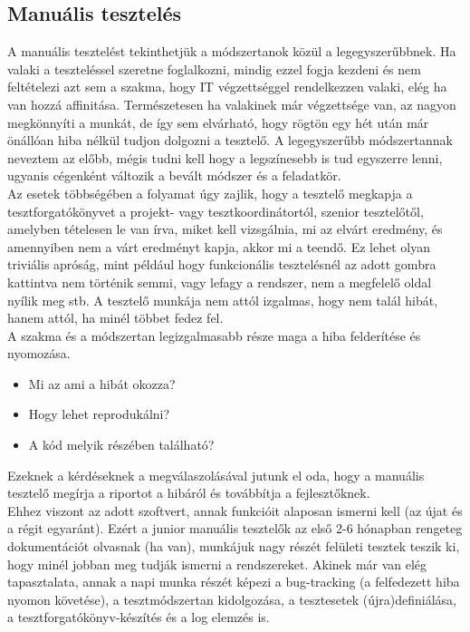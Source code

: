 \subsection{Manuális tesztelés} A manuális tesztelést tekinthetjük a módszertanok közül a legegyszerűbbnek. Ha valaki a teszteléssel szeretne foglalkozni, mindig ezzel fogja kezdeni és nem feltételezi azt sem a szakma, hogy IT végzettséggel rendelkezzen valaki, elég ha van hozzá affinitása. Természetesen ha valakinek már végzettsége van, az nagyon megkönnyíti a munkát, de így sem elvárható, hogy rögtön egy hét után már önállóan hiba nélkül tudjon dolgozni a tesztelő. A legegyszerűbb módszertannak neveztem az előbb, mégis tudni kell hogy a legszínesebb is tud egyszerre lenni, ugyanis cégenként változik a bevált módszer és a feladatkör.\\
Az esetek többségében a folyamat úgy zajlik, hogy a tesztelő megkapja a tesztforgatókönyvet a projekt- vagy tesztkoordinátortól, szenior tesztelőtől, amelyben tételesen le van írva, miket kell vizsgálnia, mi az elvárt eredmény, és amennyiben nem a várt eredményt kapja, akkor mi a teendő. Ez lehet olyan triviális apróság, mint például hogy funkcionális tesztelésnél az adott gombra kattintva nem történik semmi, vagy lefagy a rendszer, nem a megfelelő oldal nyílik meg stb. A tesztelő munkája nem attól izgalmas, hogy nem talál hibát, hanem attól, ha minél többet fedez fel\cite{computerworld}.\\
A szakma és a módszertan legizgalmasabb része maga a hiba felderítése és nyomozása. 
\begin{itemize}
\item Mi az ami a hibát okozza?
\item Hogy lehet reprodukálni?
\item A kód melyik részében található?
\end{itemize}
Ezeknek a kérdéseknek a megválaszolásával jutunk el oda, hogy a manuális tesztelő megírja a riportot a hibáról és továbbítja a fejlesztőknek.\\
Ehhez viszont az adott szoftvert, annak funkcióit alaposan ismerni kell (az újat és a régit egyaránt). Ezért a junior manuális tesztelők az első 2-6 hónapban rengeteg dokumentációt olvasnak (ha van), munkájuk nagy részét felületi tesztek teszik ki, hogy minél jobban meg tudják ismerni a rendszereket. Akinek már van elég tapasztalata, annak a napi munka részét képezi a bug-tracking (a felfedezett hiba nyomon követése), a tesztmódszertan kidolgozása, a tesztesetek (újra)definiálása, a tesztforgatókönyv-készítés és a log elemzés is\cite{computerworld}.


